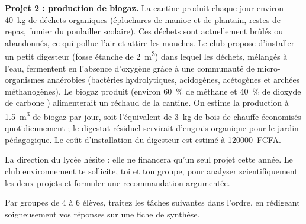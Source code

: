 \documentclass[11pt]{article}
\newcounter{popsec}
\newcounter{popsub}
\newcommand{\courssub}[1]{%
  \stepcounter{popsub}%
  \par\vspace{9pt}\noindent{\popxbold\fontsize{11.5}{13}\selectfont\color{popink}{\color{poporange}\thepopsec.\thepopsub}\hspace{6pt}#1}\par\nopagebreak\vspace{4pt}
}
\begin{document}
\textbf{Projet 2 : production de biogaz.} La cantine produit chaque jour environ \SI{40}{kg} de déchets organiques (épluchures de manioc et de plantain, restes de repas, fumier du poulailler scolaire). Ces déchets sont actuellement brûlés ou abandonnés, ce qui pollue l'air et attire les mouches. Le club propose d'installer un petit digesteur (fosse étanche de \SI{2}{m^3}) dans lequel les déchets, mélangés à l'eau, fermentent en l'absence d'oxygène grâce à une communauté de micro-organismes anaérobies (bactéries hydrolytiques, acidogènes, acétogènes et archées méthanogènes). Le biogaz produit (environ \SI{60}{\percent} de méthane  et \SI{40}{\percent} de dioxyde de carbone ) alimenterait un réchaud de la cantine. On estime la production à \SI{1,5}{m^3} de biogaz par jour, soit l'équivalent de \SI{3}{kg} de bois de chauffe économisés quotidiennement ; le digestat résiduel servirait d'engrais organique pour le jardin pédagogique. Le coût d'installation du digesteur est estimé à \SI{120000}{FCFA}.

La direction du lycée hésite : elle ne financera qu'un seul projet cette année. Le club environnement te sollicite, toi et ton groupe, pour analyser scientifiquement les deux projets et formuler une recommandation argumentée.

\courssub{Consignes}

Par groupes de 4 à 6 élèves, traitez les tâches suivantes dans l'ordre, en rédigeant soigneusement vos réponses sur une fiche de synthèse.
\end{document}
